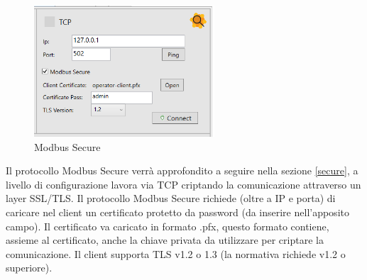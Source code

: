 \begin{figure}[H]
\centering
\includegraphics[width=0.6\textwidth]{../Img/ModBus_Home_Secure.PNG}
\caption[Modbus Secure]{Modbus Secure}
\end{figure}

Il protocollo Modbus Secure verrà approfondito a seguire nella
sezione \ref{secure}, a livello di configurazione lavora via TCP 
criptando la comunicazione attraverso un layer SSL/TLS.
Il protocollo Modbus Secure richiede (oltre a IP e porta)
di caricare nel client
un certificato protetto da password (da inserire nell'apposito campo).
Il certificato va caricato in formato .pfx, questo
formato contiene, assieme al certificato, anche 
la chiave privata da utilizzare per criptare la comunicazione.
Il client supporta TLS v1.2 o 1.3 (la normativa richiede v1.2 o superiore).